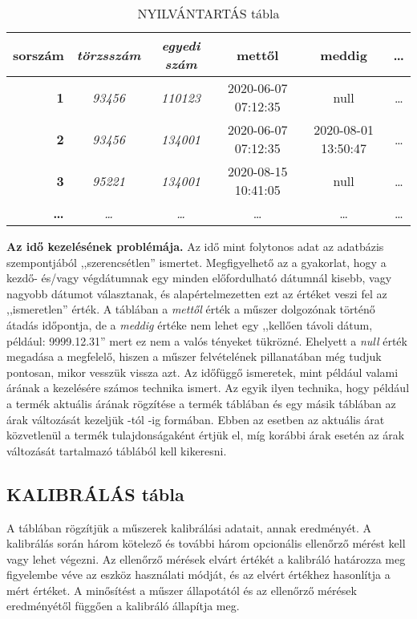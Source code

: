 \begin{table}[ht!]
	\centering
	\begin{footnotesize}
	\begin{tabular}[t]{|r|c|c|c|c|c|}
		\hline
		\textbf{sorszám}&\textit{törzsszám}&\textit{egyedi szám}&mettől&meddig&\dots \\ \hline
		\textbf{1}&\textit{93456}&\textit{110123}&2020-06-07 07:12:35&null&\dots\\
		\textbf{2}&\textit{93456}&\textit{134001}&2020-06-07 07:12:35&2020-08-01 13:50:47&\dots\\
		\textbf{3}&\textit{95221}&\textit{134001}&2020-08-15 10:41:05&null&\dots\\
		\textbf{\dots}&\textit{\dots}&\textit{\dots}&\dots&\dots&\dots\\
	\end{tabular}
\end{footnotesize}
	\caption{NYILVÁNTARTÁS tábla}\label{tabNYILVANTARTAS}
\end{table}


\begin{minipage}[t]{\linewidth}
\textsf{
		{\footnotesize \textbf{Az idő kezelésének problémája.}
	Az idő mint folytonos adat az adatbázis szempontjából ,,szerencsétlen'' ismertet. 
	Meg\-fi\-gyel\-he\-tő az a gyakorlat, hogy a kezdő- és/vagy végdátumnak egy minden előfordulható dátumnál kisebb, vagy nagyobb dátumot választanak, és alapértelmezetten ezt az értéket veszi fel az ,,ismeretlen'' érték.
	A  táblában a \textit{mettől} érték a műszer dolgozónak történő átadás időpontja, de a \textit{meddig} értéke nem lehet egy ,,kellően távoli dátum, például: 9999.12.31'' mert ez nem a valós tényeket tükrözné. Ehelyett a \textit{null} érték megadása a megfelelő, hiszen a műszer felvételének pillanatában még tudjuk pontosan, mikor vesszük vissza azt.
	Az időfüggő ismeretek, mint például valami árának a kezelésére számos technika ismert. Az egyik ilyen technika, hogy például a termék aktuális árának rögzítése a termék táblában és egy másik táblában az árak változását kezeljük -tól -ig formában. Ebben az esetben az aktuális árat közvetlenül a termék tulajdonságaként értjük el, míg korábbi árak esetén az árak változását tartalmazó táblából kell kikeresni.
	}
}
\end{minipage}

\subsection{KALIBRÁLÁS tábla}
A  táblában rögzítjük a műszerek kalibrálási adatait, annak eredményét. A kalibrálás során három kötelező és további három opcionális ellenőrző mérést kell vagy lehet végezni. Az ellenőrző mérések elvárt értékét a kalibráló határozza meg figyelembe véve az eszköz használati módját, és az elvért értékhez hasonlítja a mért értéket. A minősítést a műszer állapotától és az ellenőrző mérések eredményétől függően a kalibráló állapítja meg.
\\

